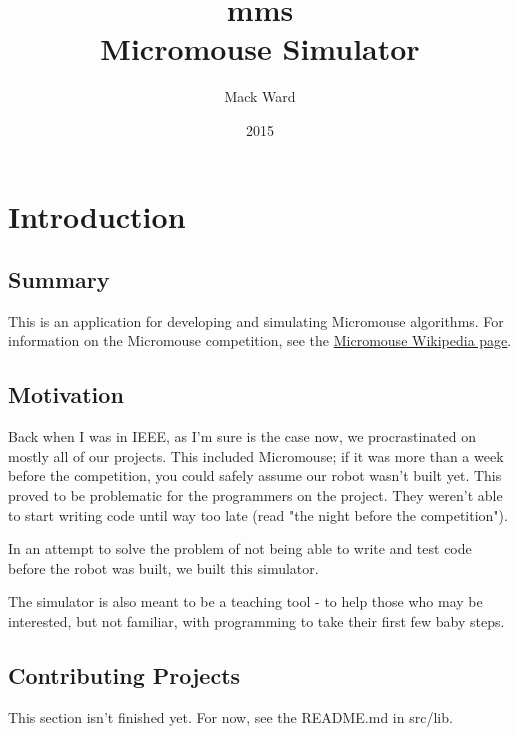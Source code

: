 \documentclass[12pt]{article}
\begin{document}
\renewcommand{\l}{\left(}
\renewcommand{\r}{\right)}

\title{\vspace{60mm}\textbf{mms}\\Micromouse Simulator}
\author{Mack Ward}
\date{2015}
\maketitle

\newpage
\renewcommand*\contentsname{Table of Contents}
\tableofcontents

\newpage
\section{Introduction}

\subsection{Summary}

This is an application for developing and simulating Micromouse algorithms. For
information on the Micromouse competition, see the
\href{http://en.wikipedia.org/wiki/Micromouse.}{Micromouse Wikipedia page}.

\subsection{Motivation}

Back when I was in IEEE, as I'm sure is the case now, we procrastinated on
mostly all of our projects. This included Micromouse; if it was more than a
week before the competition, you could safely assume our robot wasn't built
yet. This proved to be problematic for the programmers on the project. They
weren't able to start writing code until way too late (read "the night before
the competition").

In an attempt to solve the problem of not being able to write and test code
before the robot was built, we built this simulator.

The simulator is also meant to be a teaching tool - to help those who may be
interested, but not familiar, with programming to take their first few baby
steps.

\subsection{Contributing Projects}

This section isn't finished yet. For now, see the README.md in src/lib.
\end{document}
